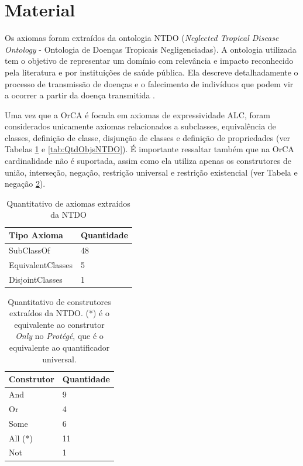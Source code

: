\documentclass{bcc}
\begin{document}
\section{Material}

Os axiomas foram extraídos da ontologia NTDO (\textit{Neglected Tropical Disease Ontology} - Ontologia de Doenças Tropicais Negligenciadas). A ontologia utilizada tem o objetivo de representar um domínio com relevância e impacto reconhecido pela literatura e por instituições de saúde pública. Ela descreve detalhadamente o processo de transmissão de doenças e o falecimento de indivíduos que podem vir a ocorrer a partir da doença transmitida \cite{ntdo}.

Uma vez que a OrCA é focada em axiomas de expressividade ALC, foram considerados unicamente axiomas relacionados a subclasses, equivalência de classes, definição de classe, disjunção de classes e definição de propriedades (ver Tabelas \ref{tab:QtdALSNTDO} e \ref{tab:QtdObjsNTDO}). É importante ressaltar também que na OrCA cardinalidade não é suportada, assim como ela utiliza apenas os construtores de união, interseção, negação, restrição universal e restrição existencial (ver Tabela e negação \ref{tab:QtdConstNTDO}).

\begin{table}[H]
\centering
\begin{tabular}{|l|l|}
\hline
Tipo Axioma       & Quantidade \\ \hline
SubClassOf        & 48         \\ \hline
EquivalentClasses & 5          \\ \hline
DisjointClasses   & 1          \\ \hline
\end{tabular}
\caption{Quantitativo de axiomas extraídos da NTDO}
\label{tab:QtdALSNTDO}
\end{table}

\begin{table}[H]
\centering
\begin{tabular}{|l|l|}
\hline
Construtor & Quantidade \\ \hline
And        & 9          \\ \hline
Or         & 4          \\ \hline
Some       & 6          \\ \hline
All (*)    & 11         \\ \hline
Not        & 1         \\ \hline
\end{tabular}
\caption{Quantitativo de construtores extraídos da NTDO. (*) é o equivalente ao construtor \textit{Only} no \textit{Protégé}, que é o equivalente ao quantificador universal.}
\label{tab:QtdConstNTDO}
\end{table}
\end{document}

